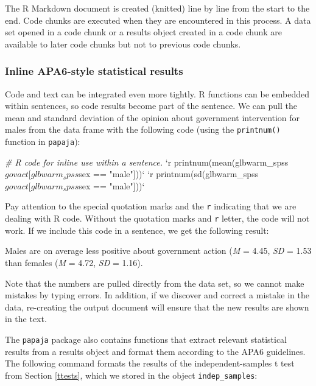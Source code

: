 \documentclass[doc,floatsintext]{apa6}
\newenvironment{Shaded}{\begin{snugshade}}{\end{snugshade}}
\newcommand{\DataTypeTok}[1]{\textcolor[rgb]{0.13,0.29,0.53}{#1}}
\newcommand{\StringTok}[1]{\textcolor[rgb]{0.31,0.60,0.02}{#1}}
\newcommand{\CommentTok}[1]{\textcolor[rgb]{0.56,0.35,0.01}{\textit{#1}}}
\begin{document}
The R Markdown document is created (knitted) line by line from the start
to the end. Code chunks are executed when they are encountered in this
process. A data set opened in a code chunk or a results object created
in a code chunk are available to later code chunks but not to previous
code chunks.

\subsubsection{Inline APA6-style statistical results}\label{inlineAPA}

Code and text can be integrated even more tightly. R functions can be
embedded within sentences, so code results become part of the sentence.
We can pull the mean and standard deviation of the opinion about
government intervention for males from the data frame with the following
code (using the \texttt{printnum()} function in \texttt{papaja}):

\begin{Shaded}
\begin{Highlighting}[]
\CommentTok{# R code for inline use within a sentence.}
\StringTok{`}\DataTypeTok{r printnum(mean(glbwarm_spss$govact[glbwarm_spss$sex == "male"]))}\StringTok{`}
\StringTok{`}\DataTypeTok{r printnum(sd(glbwarm_spss$govact[glbwarm_spss$sex == "male"]))}\StringTok{`}
\end{Highlighting}
\end{Shaded}

Pay attention to the special quotation marks and the \texttt{r}
indicating that we are dealing with R code. Without the quotation marks
and \texttt{r} letter, the code will not work. If we include this code
in a sentence, we get the following result:

Males are on average less positive about government action (\emph{M} =
4.45, \emph{SD} = 1.53 than females (\emph{M} = 4.72, \emph{SD} = 1.16).

Note that the numbers are pulled directly from the data set, so we
cannot make mistakes by typing errors. In addition, if we discover and
correct a mistake in the data, re-creating the output document will
ensure that the new results are shown in the text.

The \texttt{papaja} package also contains functions that extract
relevant statistical results from a results object and format them
according to the APA6 guidelines. The following command formats the
results of the independent-samples t test from Section \ref{ttests},
which we stored in the object \texttt{indep\_samples}:
\end{document}

